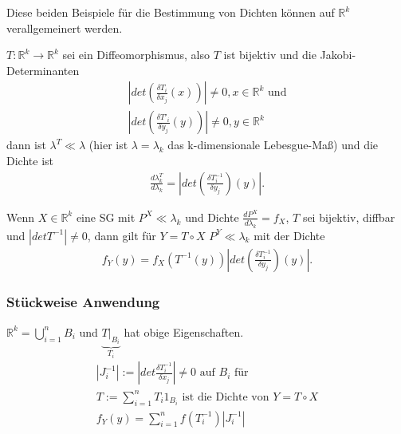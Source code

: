 \documentclass[]{article}
\begin{document}
Diese beiden Beispiele für die Bestimmung von Dichten können auf $\mathbb{R}^k$ verallgemeinert werden.

$T:\mathbb{R}^k\rightarrow\mathbb{R}^k$ sei ein Diffeomorphismus, also $T$ ist bijektiv und die Jakobi-Determinanten
\begin{align*}
	\left| det \left( \frac{\delta T_i}{\delta x_j}(x) \right)\right| \neq 0, x\in\mathbb{R}^k \text{ und}\\
	\left| det \left( \frac{\delta T'_i}{\delta y_j}(y) \right)\right| \neq 0, y\in\mathbb{R}^k
\end{align*}
dann ist $\lambda^T \ll \lambda$ (hier ist $\lambda = \lambda_k$ das k-dimensionale Lebesgue-Maß) und die Dichte ist
\begin{align*}
	\frac{d\lambda_k^T}{d\lambda_k} = \left| det \left( \frac{\delta T_i^{-1}}{\delta y_j}\right)(y)\right|.
\end{align*}

Wenn $X\in \mathbb{R}^k$ eine SG mit $P^X \ll \lambda_k$ und Dichte $\frac{dP^X}{d\lambda_k} = f_X$, $T$ sei bijektiv, diffbar und $|det T^{-1}| \neq 0$, dann gilt für $Y=T\circ X$ $P^Y \ll \lambda_k$ mit der Dichte
\begin{align*}
	f_Y(y) = f_X(T^{-1}(y)) \left| det \left( \frac{\delta T_i^{-1}}{\delta y_j} \right) (y) \right|.
\end{align*}

\subsubsection{Stückweise Anwendung}
$\mathbb{R}^k = \bigcup_{i=1}^{n} B_i$ und $\underbrace{T|_{B_i}}_{T_i}$ hat obige Eigenschaften.
\begin{align*}
	|J_i^{-1}| := \left| det \frac{\delta T_i^{-1}}{\delta x_j} \right| \neq 0 \text{ auf } B_i \text{ für}\\
	T := \sum_{i=1}^{n} T_i 1_{B_i} \text{ ist die Dichte von } Y=T\circ X\\
	f_Y(y) = \sum_{i=1}^{n} f(T_i^{-1}) |J_i^{-1}|
\end{align*}
\end{document}
